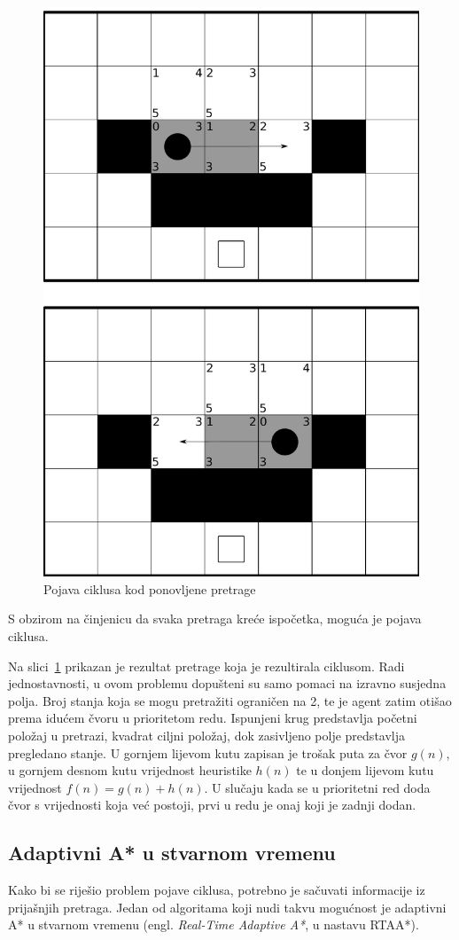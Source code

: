 \documentclass[times, utf8, zavrsni, numeric]{fer}
\begin{document}
\begin{figure}[h]
	\centering
	\includegraphics[width=0.45\linewidth]{images/repeatedAStarCycle.pdf}
	\caption{Pojava ciklusa kod ponovljene pretrage}
	\label{fig:pathfindingCycle}
\end{figure} 

\par S obzirom na činjenicu da svaka pretraga kreće ispočetka, moguća je pojava ciklusa. 

\par Na slici~\ref{fig:pathfindingCycle} prikazan je rezultat pretrage koja je rezultirala ciklusom. 
Radi jednostavnosti, u ovom problemu dopušteni su samo pomaci na izravno susjedna polja.
Broj stanja koja se mogu pretražiti ograničen na 2, te je agent zatim otišao prema idućem čvoru u prioritetom redu. 
Ispunjeni krug predstavlja početni položaj u pretrazi, kvadrat ciljni položaj, dok zasivljeno polje predstavlja pregledano stanje. 
U gornjem lijevom kutu zapisan je trošak puta za čvor \(g(n)\), u gornjem desnom kutu vrijednost heuristike \(h(n)\) te u donjem lijevom kutu vrijednost \(f(n) = g(n) + h(n)\).
U slučaju kada se u prioritetni red doda čvor s vrijednosti koja već postoji, prvi u redu je onaj koji je zadnji dodan.

\subsection{Adaptivni A* u stvarnom vremenu}
\par Kako bi se riješio problem pojave ciklusa, potrebno je sačuvati informacije iz prijašnjih pretraga.
Jedan od algoritama koji nudi takvu mogućnost je adaptivni A* u stvarnom vremenu (engl. \textit{Real-Time Adaptive A*}, u nastavu RTAA*).
\end{document}
